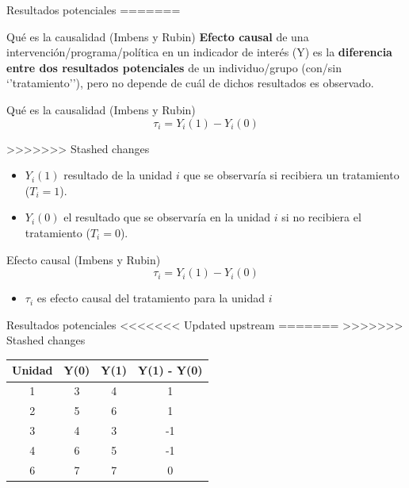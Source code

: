 \documentclass[
  ignorenonframetext,
]{beamer}
\providecommand{\tightlist}{%
  \setlength{\itemsep}{0pt}\setlength{\parskip}{0pt}}
\begin{document}
\begin{frame}{Resultados potenciales}
\protect\hypertarget{resultados-potenciales}{}
=======
\begin{frame}{Qué es la causalidad (Imbens y Rubin)}
\protect\hypertarget{quuxe9-es-la-causalidad-imbens-y-rubin}{}
\textbf{Efecto causal} de una intervención/programa/política en un
indicador de interés (Y) es la \textbf{diferencia entre dos resultados
potenciales} de un individuo/grupo (con/sin `'tratamiento''), pero no
depende de cuál de dichos resultados es observado.
\end{frame}

\begin{frame}{Qué es la causalidad (Imbens y Rubin)}
\protect\hypertarget{quuxe9-es-la-causalidad-imbens-y-rubin-1}{}
\[\tau_i=Y_i(1)-Y_i(0)\]

>>>>>>> Stashed changes
\begin{itemize}
\item
  \(Y_i(1)\) resultado de la unidad \(i\) que se observaría si recibiera
  un tratamiento (\(T_i=1\)).
\item
  \(Y_i(0)\) el resultado que se observaría en la unidad \(i\) si no
  recibiera el tratamiento (\(T_i=0\)).
\end{itemize}
\end{frame}

\begin{frame}{Efecto causal (Imbens y Rubin)}
\protect\hypertarget{efecto-causal-imbens-y-rubin-1}{}
\[\tau_i=Y_i(1)-Y_i(0)\]

\begin{itemize}
\tightlist
\item
  \(\tau_i\) es efecto causal del tratamiento para la unidad \(i\)
\end{itemize}
\end{frame}

\begin{frame}{Resultados potenciales}
<<<<<<< Updated upstream
\protect\hypertarget{resultados-potenciales-1}{}
=======
\protect\hypertarget{resultados-potenciales}{}
>>>>>>> Stashed changes
\begin{table}[]
\begin{tabular}{cccc}
Unidad & Y(0) & Y(1) & Y(1) - Y(0) \\ \hline
1      & 3    & 4    & 1           \\
2      & 5    & 6    & 1           \\
3      & 4    & 3    & -1          \\
4      & 6    & 5    & -1          \\ 
6      & 7    & 7    & 0           \\ 


\end{tabular}
\end{table}
\end{frame}
\end{frame}
\end{document}
